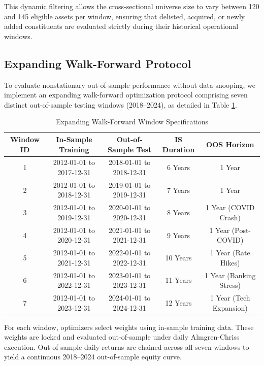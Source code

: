 \documentclass[11pt,a4paper]{article}
\begin{document}
This dynamic filtering allows the cross-sectional universe size to vary between 120 and 145 eligible assets per window, ensuring that delisted, acquired, or newly added constituents are evaluated strictly during their historical operational windows.

\subsection{Expanding Walk-Forward Protocol}
To evaluate nonstationary out-of-sample performance without data snooping, we implement an expanding walk-forward optimization protocol comprising seven distinct out-of-sample testing windows (2018--2024), as detailed in Table \ref{tab:wf_windows}.

\begin{table}[htbp]
\centering
\caption{Expanding Walk-Forward Window Specifications}
\label{tab:wf_windows}
\hspace*{-1.7cm}
\begin{tabular}{ccccc}
\toprule
\textbf{Window ID} & \textbf{In-Sample Training} & \textbf{Out-of-Sample Test} & \textbf{IS Duration} & \textbf{OOS Horizon} \\
\midrule
1 & 2012-01-01 to 2017-12-31 & 2018-01-01 to 2018-12-31 & 6 Years & 1 Year \\
2 & 2012-01-01 to 2018-12-31 & 2019-01-01 to 2019-12-31 & 7 Years & 1 Year \\
3 & 2012-01-01 to 2019-12-31 & 2020-01-01 to 2020-12-31 & 8 Years & 1 Year (COVID Crash) \\
4 & 2012-01-01 to 2020-12-31 & 2021-01-01 to 2021-12-31 & 9 Years & 1 Year (Post-COVID) \\
5 & 2012-01-01 to 2021-12-31 & 2022-01-01 to 2022-12-31 & 10 Years & 1 Year (Rate Hikes) \\
6 & 2012-01-01 to 2022-12-31 & 2023-01-01 to 2023-12-31 & 11 Years & 1 Year (Banking Stress) \\
7 & 2012-01-01 to 2023-12-31 & 2024-01-01 to 2024-12-31 & 12 Years & 1 Year (Tech Expansion) \\
\bottomrule
\end{tabular}
\end{table}

For each window, optimizers select weights using in-sample training data. These weights are locked and evaluated out-of-sample under daily Almgren-Chriss execution. Out-of-sample daily returns are chained across all seven windows to yield a continuous 2018--2024 out-of-sample equity curve.
\end{document}
